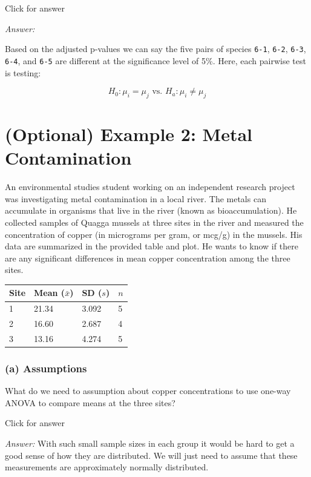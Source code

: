 \documentclass[
]{book}
\begin{document}
Click for answer

\emph{Answer:}

Based on the adjusted p-values we can say the five pairs of species \texttt{6-1}, \texttt{6-2}, \texttt{6-3}, \texttt{6-4}, and \texttt{6-5} are different at the significance level of 5\%. Here, each pairwise test is testing:

\[H_0: \mu_i = \mu_j \text{ vs. } H_a: \mu_i \neq \mu_j\]

\hypertarget{optional-example-2-metal-contamination}{%
\section{(Optional) Example 2: Metal Contamination}\label{optional-example-2-metal-contamination}}

An environmental studies student working on an independent research project was investigating metal contamination in a local river. The metals can accumulate in organisms that live in the river (known as bioaccumulation). He collected samples of Quagga mussels at three sites in the river and measured the concentration of copper (in micrograms per gram, or mcg/g) in the mussels. His data are summarized in the provided table and plot. He wants to know if there are any significant differences in mean copper concentration among the three sites.

\begin{longtable}[]{@{}llll@{}}
\toprule()
Site & Mean (\(\bar{x}\)) & SD (\(s\)) & \(n\) \\
\midrule()
\endhead
1 & 21.34 & 3.092 & 5 \\
2 & 16.60 & 2.687 & 4 \\
3 & 13.16 & 4.274 & 5 \\
\bottomrule()
\end{longtable}

\hypertarget{a-assumptions}{%
\subsubsection{(a) Assumptions}\label{a-assumptions}}

What do we need to assumption about copper concentrations to use one-way ANOVA to compare means at the three sites?

Click for answer

\emph{Answer:} With such small sample sizes in each group it would be hard to get a good sense of how they are distributed. We will just need to assume that these measurements are approximately normally distributed.
\end{document}

